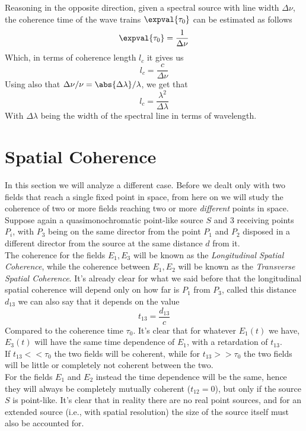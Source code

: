 \documentclass[../electromagnetism.tex]{subfiles}
\begin{document}
Reasoning in the opposite direction, given a spectral source with line width $\Delta\nu$, the coherence time of the wave trains $\expval{\tau_0}$ can be estimated as follows
\begin{equation*}
	\expval{\tau_0}=\frac{1}{\Delta\nu}
\end{equation*}
Which, in terms of coherence length $l_c$ it gives us
\begin{equation*}
	l_c=\frac{c}{\Delta\nu}
\end{equation*}
Using also that $\Delta\nu/\nu=\abs{\Delta\lambda}/\lambda$, we get that
\begin{equation}
	l_c=\frac{\lambda^2}{\Delta\lambda}
	\label{eq:coherencelengthwavetrain}
\end{equation}
With $\Delta\lambda$ being the width of the spectral line in terms of wavelength.
\section{Spatial Coherence}
In this section we will analyze a different case. Before we dealt only with two fields that reach a single fixed point in space, from here on we will study the coherence of two or more fields reaching two or more \textit{different} points in space.\\
Suppose again a quasimonochromatic point-like source $S$ and 3 receiving points $P_i$, with $P_3$ being on the same director from the point $P_1$ and $P_2$ disposed in a different director from the source at the same distance $d$ from it.\\
The coherence for the fields $E_1,E_3$ will be known as the \emph{Longitudinal Spatial Coherence}, while the coherence between $E_1,E_2$ will be known as the \textit{Transverse Spatial Coherence}. It's already clear for what we said before that the longitudinal spatial coherence will depend only on how far is $P_1$ from $P_3$, called this distance $d_{13}$ we can also say that it depends on the value
\begin{equation*}
	t_{13}=\frac{d_{13}}{c}
\end{equation*}
Compared to the coherence time $\tau_0$. It's clear that for whatever $E_1(t)$ we have, $E_3(t)$ will have the same time dependence of $E_1$, with a retardation of $t_{13}$.\\
If $t_{13}<<\tau_0$ the two fields will be coherent, while for $t_{13}>>\tau_0$ the two fields will be little or completely not coherent between the two.\\
For the fields $E_1$ and $E_2$ instead the time dependence will be the same, hence they will always be completely mutually coherent ($t_{12}=0$), but only if the source $S$ is point-like. It's clear that in reality there are no real point sources, and for an extended source (i.e., with spatial resolution) the size of the source itself must also be accounted for.\\
\end{document}
